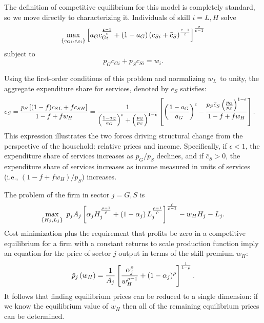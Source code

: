 \documentclass[12pt,english]{article}
\begin{document}
The definition of competitive equilibrium for this model is completely
standard, so we move directly to characterizing it. Individuals of skill $%
i=L,H$ solve 
\begin{equation*}
\max_{\left\{ c_{Gi},c_{Si}\right\} }\left[ a_{G}c_{Gi}^{\frac{\varepsilon -1%
}{\varepsilon }}+(1-a_{G})\left( c_{Si}+\bar{c}_{S}\right) ^{\frac{%
\varepsilon -1}{\varepsilon }}\right] ^{\frac{\varepsilon }{\varepsilon -1}}
\end{equation*}%
subject to 
\begin{equation}
p_{G}c_{Gi}+p_{S}c_{Si}=w_{i}.  \label{eq:BC}
\end{equation}

Using the first-order conditions of this problem and normalizing $w_{L\text{ 
}}$to unity, the aggregate expenditure share for services, denoted by $e_{S}$
satisfies: {\small 
\begin{align}
e_{S} & =\frac{p_{S}\left[ (1-f)c_{SL}+fc_{SH}\right] }{1-f+fw_{H}} = \frac{1%
}{\left( \frac{1-a_{G}}{a_{G}}\right) ^{\varepsilon }+\left( \frac{p_{G}}{%
p_{S}}\right) ^{1-\epsilon }}\left[ \left( \frac{1-a_{G}}{a_{G}}\right)
^{\varepsilon }-\frac{p_{S}\bar{c}_{S}\left( \frac{p_{G}}{p_{S}}\right)
^{1-\epsilon }}{1-f+fw_{H}}\right] .  \label{shh}
\end{align}
}{\normalsize This expression illustrates the two forces driving structural
change from the perspective of the household: relative prices and income.
Specifically, if $\epsilon <1$, the expenditure share of services increases
as $p_{G}/p_{S} $ declines, and if $\bar{c}_{S}>0$, the expenditure share of
services increases as income measured in units of services (i.e., $%
(1-f+fw_{H})/p_{S}$) increases. }

{\normalsize The problem of the firm in sector $j=G,S$ is 
\begin{equation*}
\max_{\left\{ H_{j},L_{j}\right\} }\text{ }p_{j}A_{j}\left[ \alpha
_{j}H_{j}^{\frac{\rho -1}{\rho }}+\left( 1-\alpha _{j}\right) L_{j}^{\frac{%
\rho -1}{\rho }}\right] ^{\frac{\rho }{\rho -1}}-w_{H}H_{j}-L_{j}.
\end{equation*}%
Cost minimization plus the requirement that profits be zero in a competitive
equilibrium for a firm with a constant returns to scale production function
imply an equation for the price of sector $j$ output in terms of the skill
premium $w_{H}:$ 
\begin{equation}
\hat{p}_{j}\left( w_{H}\right) =\frac{1}{A_{j}}\left[ \frac{\alpha
_{j}^{\rho }}{w_{H}^{\rho -1}}+(1-\alpha _{j})^{\rho }\right] ^{\frac{1}{%
1-\rho }}.  \label{eq:pi(w)}
\end{equation}%
It follows that finding equilibrium prices can be reduced to a single
dimension: if we know the equilibrium value of $w_{H}$ then all of the
remaining equilibrium prices can be determined. }
\end{document}
